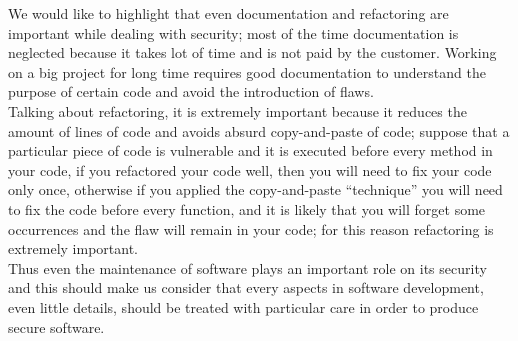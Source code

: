 We would like to highlight that even documentation and refactoring are important while dealing with security; most of the time documentation is neglected because it takes lot of time and is not paid by the customer. Working on a big project for long time
requires good documentation to understand the purpose of certain code and avoid the introduction of flaws.\\
Talking about refactoring, it is extremely important because it reduces the amount of lines of code and
avoids absurd copy-and-paste of code; suppose that a particular piece of code is vulnerable and it is executed
before every method in your code, if you refactored your code well, then you will need to fix your code only once, otherwise
if you applied the copy-and-paste ``technique'' you will need to fix the code before every function, and it is likely that you will forget some occurrences and the flaw will remain in your code; for this reason refactoring is extremely important.\\
Thus even the maintenance of software plays an important role on its security and this should make us consider that every
aspects in software development, even little details, should be treated with particular care in order to produce secure software.
